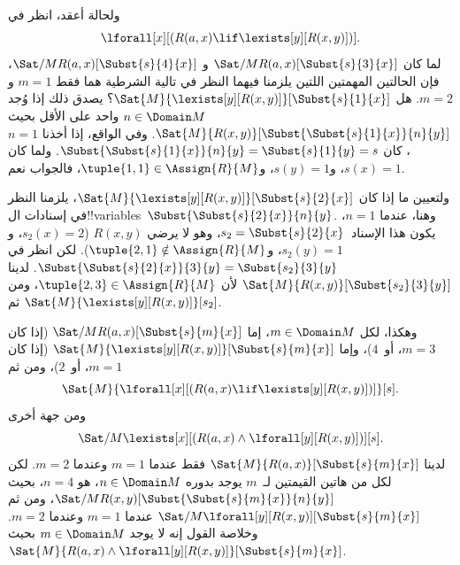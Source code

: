 \documentclass[../../../include/open-logic-section]{subfiles}
\begin{document}
\begin{ex}

ولحالة أعقد، انظر في
\[
\lforall[x][(R(a,x) \lif \lexists[y][R(x,y)])].
\]
لما كان $\Sat/{M}{R(a,x)}[\Subst{s}{3}{x}]$ و
$\Sat/{M}{R(a,x)}[\Subst{s}{4}{x}]$، فإن الحالتين المهمتين
اللتين يلزمنا فيهما النظر في تالية الشرطية هما فقط $m = 1$
و$m = 2$. هل $\Sat{M}{\lexists[y][R(x,y)]}[\Subst{s}{1}{x}]$؟
يصدق ذلك إذا وُجد $n \in \Domain M$ واحد على الأقل بحيث
$\Sat{M}{R(x,y)}[\Subst{\Subst{s}{1}{x}}{n}{y}]$. وفي الواقع، إذا
أخذنا $n = 1$، كان
$\Subst{\Subst{s}{1}{x}}{n}{y} = \Subst{s}{1}{y} = s$. ولما كان
$s(x) = 1$، و$s(y) = 1$، و$\tuple{1,1} \in \Assign{R}{M}$، فالجواب
نعم.

ولتعيين ما إذا كان
$\Sat{M}{\lexists[y][R(x,y)]}[\Subst{s}{2}{x}]$، يلزمنا النظر في
إسنادات ال!!{variable}s~$\Subst{\Subst{s}{2}{x}}{n}{y}$. وهنا،
عندما $n = 1$، يكون هذا الإسناد~$s_2 = \Subst{s}{2}{x}$، وهو لا
يرضي $R(x,y)$ ($s_2(x) = 2$، و$s_2(y) = 1$،
و$\tuple{2,1}\notin \Assign{R}{M}$). لكن انظر في
$\Subst{\Subst{s}{2}{x}}{3}{y} = \Subst{s_2}{3}{y}$.
لدينا $\Sat{M}{R(x,y)}[\Subst{s_2}{3}{y}]$ لأن
$\tuple{2,3} \in \Assign{R}{M}$، ومن ثم
$\Sat{M}{\lexists[y][R(x,y)]}[s_2]$.

وهكذا، لكل $m \in \Domain M$، إما
$\Sat/{M}{R(a,x)}[\Subst{s}{m}{x}]$ (إذا كان $m = 3$، أو~$4$)،
وإما $\Sat{M}{\lexists[y][R(x,y)]}[\Subst{s}{m}{x}]$ (إذا كان
$m = 1$، أو~$2$)، ومن ثم
\[
\Sat{M}{\lforall[x][(R(a,x) \lif \lexists[y][R(x,y)])]}[s].
\]
ومن جهة أخرى
\[
\Sat/{M}{\lexists[x][(R(a,x) \land \lforall[y][R(x,y)])]}[s].
\]
لدينا $\Sat{M}{R(a,x)}[\Subst{s}{m}{x}]$ فقط عندما $m = 1$ وعندما
$m = 2$. لكن لكل من هاتين القيمتين لـ~$m$ يوجد بدوره
$n \in \Domain M$، هو $n = 4$، بحيث
$\Sat/{M}{R(x,y)}[\Subst{\Subst{s}{m}{x}}{n}{y}]$، ومن ثم
$\Sat/{M}{\lforall[y][R(x,y)]}[\Subst{s}{m}{x}]$ عندما $m = 1$
وعندما $m = 2$. وخلاصة القول إنه لا يوجد $m \in \Domain M$ بحيث
$\Sat{M}{R(a,x) \land \lforall[y][R(x,y)]}[\Subst{s}{m}{x}]$.
\end{ex}
\end{document}
